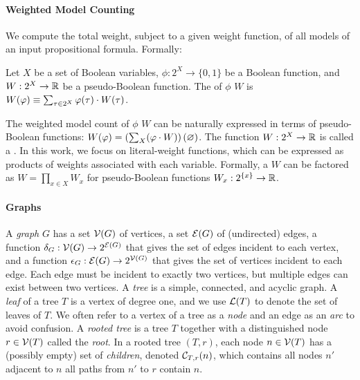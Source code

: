 
\paragraph{\textbf{Weighted Model Counting}}

We compute the total weight, subject to a given weight function, of all models of an input propositional formula.
Formally:
\begin{definition}
    Let $X$ be a set of Boolean variables, $\phi: 2^X \to \{0,1\}$ be a Boolean function, and $W: 2^X \to \mathbb{R}$ be a pseudo-Boolean function.
    The  of $\phi$ \wrt{} $W$ is
    $W(\varphi) \equiv \sum_{\tau \in 2^X} \varphi(\tau) \cdot W(\tau)$.
\end{definition}

The weighted model count of $\phi$ \wrt{} $W$ can be naturally expressed in terms of pseudo-Boolean functions: $W(\varphi) = \left(\sum_X (\varphi \cdot W) \right)(\varnothing)$.
The function $W: 2^X \to \mathbb{R}$ is called a .
In this work, we focus on {literal-weight functions}, which can be expressed as products of weights associated with each variable.
Formally, a  $W$ can be factored as $W = \prod_{x \in X} W_x$ for pseudo-Boolean functions $W_x: 2^{\{x\}} \to \mathbb{R}$.


\paragraph{\textbf{Graphs}}

A \emph{graph} $G$ has a
set $\mathcal{V}(G)$ of vertices, a set $\mathcal{E}(G)$ of (undirected) edges, a function $\delta_G: \mathcal{V}(G) \to 2^{\mathcal{E}(G)}$ that gives the set of edges incident to each vertex, and a function $\epsilon_G: \mathcal{E}(G) \to 2^{\mathcal{V}(G)}$ that gives the set of vertices incident to each edge.
Each edge must be incident to exactly two vertices, but multiple edges can exist between two vertices.
A \emph{tree} is a simple, connected, and acyclic graph.
A \emph{leaf} of a tree $T$ is a vertex of degree one, and we use $\mathcal{L}(T)$ to denote the set of leaves of $T$.
We often refer to a vertex of a tree as a \emph{node} and an edge as an \emph{arc} to avoid confusion.
A \emph{rooted tree} is a tree $T$ together with a distinguished node $r \in \mathcal{V}(T)$ called the \emph{root}.
In a rooted tree $(T, r)$, each node $n \in \mathcal{V}(T)$ has a (possibly empty) set of \emph{children}, denoted $\mathcal{C}_{T,r}(n)$, which contains all nodes $n'$ adjacent to $n$ \st{} all paths from $n'$ to $r$ contain $n$.

